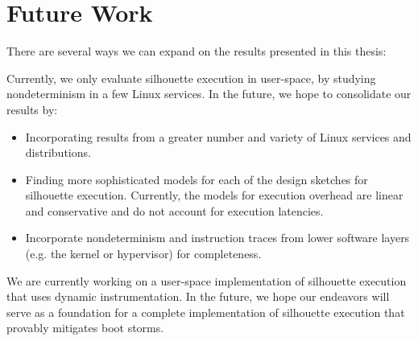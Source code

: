 \section {Future Work}
There are several ways we can expand on the 
results presented in this thesis: \newline

\newline
Currently, we only evaluate silhouette
execution in user-space, by studying
nondeterminism in a few Linux services. 
In the future, we hope to consolidate
our results by:
\begin{itemize}
\item Incorporating results from a greater 
  number and variety of Linux services and
  distributions.
\item Finding more sophisticated models 
  for each of the design sketches
  for silhouette execution. Currently,
  the models for execution overhead are linear and
  conservative and do not account for
  execution latencies.
\item Incorporate nondeterminism
and instruction traces from lower software
layers (e.g. the kernel or hypervisor)
for completeness.
\end{itemize} 
\newline
We are currently working on a user-space
implementation of silhouette execution 
that uses dynamic instrumentation.
In the future, we hope
our endeavors will serve as a foundation
for a complete implementation of silhouette execution
that provably mitigates boot storms. \newline

